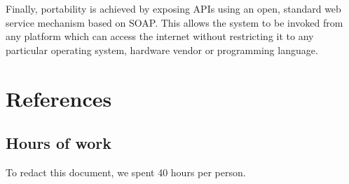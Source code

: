 Finally, portability is achieved by exposing APIs using an open, standard web service mechanism based on SOAP. This allows the system to be invoked from any platform which can access the internet without restricting it to any particular operating system, hardware vendor or programming language. 

\chapter{References}

\begin{appendices}

\chapter{Hours of work}
To redact this document, we spent 40 hours per person.


\end{appendices}